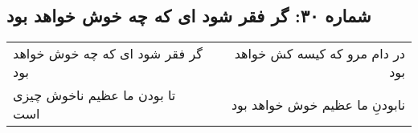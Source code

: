 \begin{center}
\section*{شماره ۳۰: گر فقر شود ای که چه خوش خواهد بود}
\label{sec:030}
\begin{longtable}{l p{0.5cm} r}
گر فقر شود ای که چه خوش خواهد بود
&&
در دام مرو که کیسه کش خواهد بود
\\
تا بودن ما عظیم ناخوش چیزی است
&&
نابودنِ ما عظیم خوش خواهد بود
\\
\end{longtable}
\end{center}
